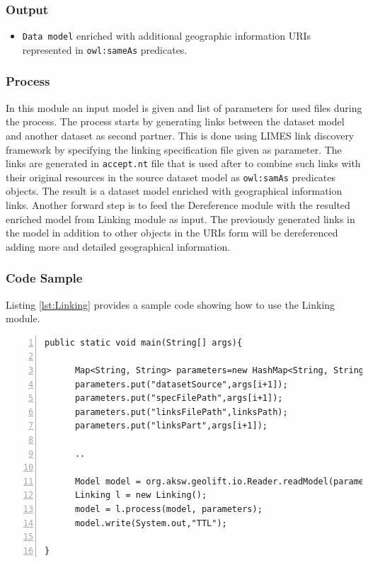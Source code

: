 \documentclass[a4paper,twoside,bibtotoc,abstracton,12pt,BCOR=15mm]{article}
\begin{document}
\subsubsection{Output}
\begin{itemize}
 \item \texttt{Data model} enriched with additional geographic information URIs represented in \texttt{owl:sameAs} predicates.
\end{itemize}

\subsubsection{Process}
In this module an input model is given and list of parameters for used files during the process. The process starts by generating links between the dataset model and another dataset as second partner. 
This is done using LIMES link discovery framework by specifying the linking specification file given as parameter.
The links are generated in \texttt{accept.nt} file that is used after to combine such links with their original resources in the source dataset model as \texttt{owl:samAs} predicates objects. The result is a dataset model enriched with geographical information links. 
Another forward step is to feed the Dereference module with the resulted enriched model from Linking module as input. 
The previously generated links in the model in addition to other objects in the URIs form will be dereferenced adding more and detailed geographical information.
\subsubsection{Code Sample}
Listing \ref{lst:Linking} provides a sample code showing how to use the Linking module.
\begingroup
    \fontsize{8pt}{10pt}\selectfont
\begin{lstlisting}[label=lst:Linking, numbers=left, numberstyle=\tiny, caption = Code fragment to call the \texttt{Linking} class.]
public static void main(String[] args){
      
      Map<String, String> parameters=new HashMap<String, String>();
      parameters.put("datasetSource",args[i+1]);
      parameters.put("specFilePath",args[i+1]);
      parameters.put("linksFilePath",linksPath);
      parameters.put("linksPart",args[i+1]);

      ..
      
      Model model = org.aksw.geolift.io.Reader.readModel(parameters.get("datasetSource"));
      Linking l = new Linking();
      model = l.process(model, parameters);
      model.write(System.out,"TTL");
 
}
\end{lstlisting}
\endgroup
\end{document}
